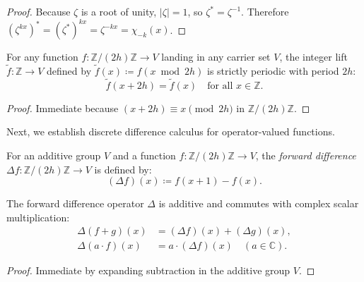 \begin{proof}
Because $\zeta$ is a root of unity, $|\zeta| = 1$, so $\zeta^* = \zeta^{-1}$. Therefore $(\zeta^{k x})^* = (\zeta^*)^{k x} = \zeta^{-k x} = \chi_{-k}(x)$.
\end{proof}

\begin{lemma}
\label{lem:app_integer_lift_periodic}
For any function $f : \mathbb{Z}/(2h)\mathbb{Z} \to V$ landing in any carrier set $V$, the integer lift $\widetilde{f} : \mathbb{Z} \to V$ defined by $\widetilde{f}(x) \coloneqq f(x \bmod 2h)$ is strictly periodic with period $2h$:
\begin{equation}
\widetilde{f}(x + 2h) = \widetilde{f}(x) \quad \text{for all } x \in \mathbb{Z}.
\end{equation}
\end{lemma}

\begin{proof}
Immediate because $(x + 2h) \equiv x \pmod{2h}$ in $\mathbb{Z}/(2h)\mathbb{Z}$.
\end{proof}

Next, we establish discrete difference calculus for operator-valued functions.

\begin{definition}
For an additive group $V$ and a function $f : \mathbb{Z}/(2h)\mathbb{Z} \to V$, the \emph{forward difference} $\Delta f : \mathbb{Z}/(2h)\mathbb{Z} \to V$ is defined by:
\begin{equation}
(\Delta f)(x) \coloneqq f(x + 1) - f(x).
\end{equation}
\end{definition}

\begin{lemma}
\label{lem:app_forward_diff_linearity}
The forward difference operator $\Delta$ is additive and commutes with complex scalar multiplication:
\begin{align}
\Delta (f + g)(x) &= (\Delta f)(x) + (\Delta g)(x), \\
\Delta (a \cdot f)(x) &= a \cdot (\Delta f)(x) \quad (a \in \mathbb{C}).
\end{align}
\end{lemma}

\begin{proof}
Immediate by expanding subtraction in the additive group $V$.
\end{proof}

